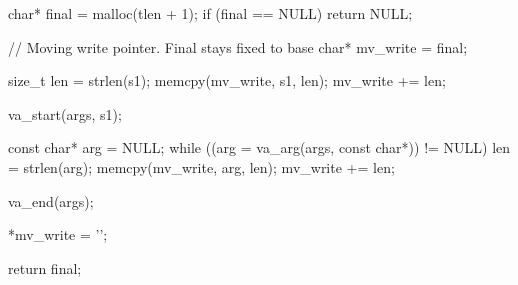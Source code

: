 \documentclass{report}
\begin{document}
\begin{itemize}
\begin{cppcode}
{                        char* final = malloc(tlen + 1);
                        if (final == NULL) {
                            return NULL;
                        }

                        // Moving write pointer. Final stays fixed to base
                        char* mv_write = final;

                        size_t len = strlen(s1);
                        memcpy(mv_write, s1, len);
                        mv_write += len;

                        va_start(args, s1);

                        const char* arg = NULL;
                        while ((arg = va_arg(args, const char*)) != NULL) {
                            len = strlen(arg);
                            memcpy(mv_write, arg, len);
                            mv_write += len;
                        }

                        va_end(args);

                        *mv_write = '\0';

                        return final;
                    }
                \end{cppcode}

        \end{itemize}

        \pagebreak 
\end{document}

